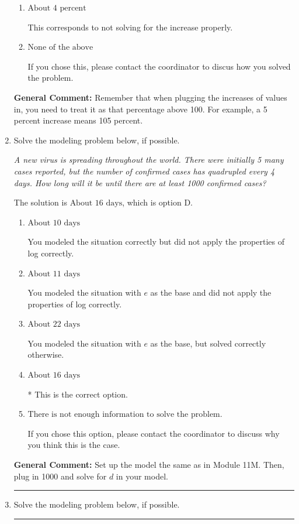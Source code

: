 \documentclass{extbook}[14pt]
\newcommand{\litem}[1]{\item #1

\rule{\textwidth}{0.4pt}}
\begin{document}
\begin{enumerate}
{\begin{enumerate}[label=\Alph*.]
This corresponds to solving correctly but treating both radius and height as equal contributors to the volume.
\item \( \text{About } 4 \text{ percent} \)

This corresponds to not solving for the increase properly.
\item \( \text{None of the above} \)

If you chose this, please contact the coordinator to discus how you solved the problem.
\end{enumerate}

\textbf{General Comment:} Remember that when plugging the increases of values in, you need to treat it as that percentage above 100. For example, a 5 percent increase means 105 percent.
}
\litem{
Solve the modeling problem below, if possible.

\begin{center}
    \textit{ A new virus is spreading throughout the world. There were initially 5 many cases reported, but the number of confirmed cases has quadrupled every 4 days. How long will it be until there are at least 1000 confirmed cases? }
\end{center}
The solution is \( \text{About } 16 \text{ days} \), which is option D.\begin{enumerate}[label=\Alph*.]
\item \( \text{About } 10 \text{ days} \)

You modeled the situation correctly but did not apply the properties of log correctly.
\item \( \text{About } 11 \text{ days} \)

You modeled the situation with $e$ as the base and did not apply the properties of log correctly.
\item \( \text{About } 22 \text{ days} \)

You modeled the situation with $e$ as the base, but solved correctly otherwise.
\item \( \text{About } 16 \text{ days} \)

* This is the correct option.
\item \( \text{There is not enough information to solve the problem.} \)

If you chose this option, please contact the coordinator to discuss why you think this is the case.
\end{enumerate}

\textbf{General Comment:} Set up the model the same as in Module 11M. Then, plug in 1000 and solve for $d$ in your model.
}
\litem{
Solve the modeling problem below, if possible.

}
\end{enumerate}
\end{document}
